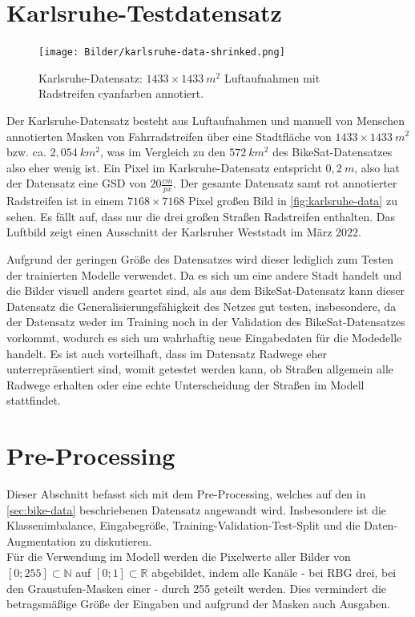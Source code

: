 \section{Karlsruhe-Testdatensatz} \label{sec:karlsruhe}


\begin{figure}[h]
	\centering
	\texttt{[image: Bilder/karlsruhe-data-shrinked.png]} 
	\caption{Karlsruhe-Datensatz: $1433{\times}1433~ m^2$ Luftaufnahmen mit Radstreifen cyanfarben annotiert.}
	\label{fig:karlsruhe-data}
\end{figure} 

Der Karlsruhe-Datensatz besteht aus Luftaufnahmen und manuell von Menschen annotierten Masken von Fahrradstreifen 
über eine Stadtfläche von $1433{\times}1433~ m^2$ bzw. ca. $2,054~ km^2$, was im Vergleich zu den 
$572~ km^2$ des BikeSat-Datensatzes also eher wenig ist. Ein Pixel im Karlsruhe-Datensatz entspricht $0,2~m$, 
also hat der Datensatz eine GSD von $20 \frac{cm}{px}$.
Der gesamte Datensatz samt rot annotierter Radstreifen ist in einem 
$7168{\times}7168$ Pixel großen Bild in \autoref{fig:karlsruhe-data} zu sehen. Es fällt auf, 
dass nur die drei großen Straßen Radstreifen enthalten. Das Luftbild zeigt einen Ausschnitt der Karlsruher Weststadt im März 2022. 


Aufgrund der geringen Größe des Datensatzes wird dieser lediglich zum Testen der trainierten Modelle verwendet. 
Da es sich um eine andere Stadt handelt und die Bilder visuell anders geartet sind, als aus dem BikeSat-Datensatz 
kann dieser Datensatz die Generalisierungsfähigkeit des Netzes gut testen, insbesondere, da der Datensatz weder 
im Training noch in der Validation des BikeSat-Datensatzes vorkommt, wodurch es sich um wahrhaftig neue Eingabedaten für die Modedelle handelt. 
Es ist auch vorteilhaft, dass im Datensatz Radwege eher unterrepräsentiert sind, womit getestet werden kann, 
ob Straßen allgemein alle Radwege erhalten oder eine echte Unterscheidung der Straßen im Modell stattfindet.


\section{Pre-Processing} \label{sec:pre-processing}

Dieser Abschnitt befasst sich mit dem Pre-Processing, welches auf den in \autoref{sec:bike-data} 
beschriebenen Datensatz angewandt wird. Insbesondere ist die Klassenimbalance, Eingabegröße, 
Training-Validation-Test-Split und die Daten-Augmentation zu diskutieren. \\
Für die Verwendung im Modell werden die Pixelwerte aller Bilder von $[0; 255] \subset \mathbb{N}$
auf $[0;1] \subset \mathbb{R}$ abgebildet, indem alle Kanäle - bei RBG drei, bei den Graustufen-Masken einer - durch 255 geteilt werden.
Dies vermindert die betragsmäßige Größe der Eingaben und aufgrund der Masken auch Ausgaben. 

